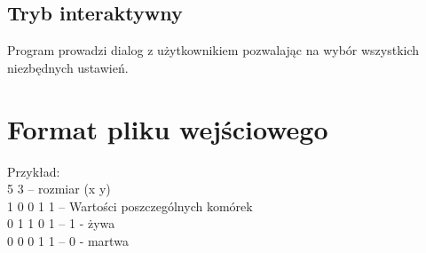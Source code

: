 \documentclass{report}
\begin{document}
\subsection{Tryb interaktywny}
Program prowadzi dialog z użytkownikiem pozwalając na wybór wszystkich niezbędnych ustawień.

\section{Format pliku wejściowego}  \label{format}
Przykład: \\
5 3 \tab -- rozmiar (x y) \\
1 0 0 1 1 \tab -- Wartości poszczególnych komórek \\
0 1 1 0 1 \tab -- 1 - żywa \\
0 0 0 1 1 \tab -- 0 - martwa \\
\end{document}
